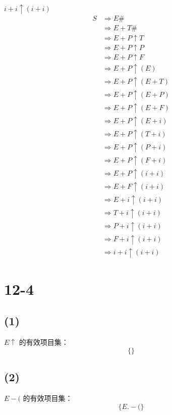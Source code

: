 \documentclass[UTF8]{ctexart}
\begin{document}
        $i+i\uparrow(i+i)$
        \begin{align*}
            S
            & \Rightarrow E\# \\
            & \Rightarrow E+T\# \\
            & \Rightarrow E+P\uparrow T \\
            & \Rightarrow E+P\uparrow P \\
            & \Rightarrow E+P\uparrow F \\
            & \Rightarrow E+P\uparrow (E) \\
            & \Rightarrow E+P\uparrow (E+T) \\
            & \Rightarrow E+P\uparrow (E+P) \\
            & \Rightarrow E+P\uparrow (E+F) \\
            & \Rightarrow E+P\uparrow (E+i) \\
            & \Rightarrow E+P\uparrow (T+i) \\
            & \Rightarrow E+P\uparrow (P+i) \\
            & \Rightarrow E+P\uparrow (F+i) \\
            & \Rightarrow E+P\uparrow (i+i) \\
            & \Rightarrow E+F\uparrow (i+i) \\
            & \Rightarrow E+i\uparrow (i+i) \\
            & \Rightarrow T+i\uparrow (i+i) \\
            & \Rightarrow P+i\uparrow (i+i) \\
            & \Rightarrow F+i\uparrow (i+i) \\
            & \Rightarrow i+i\uparrow (i+i)
        \end{align*}

\section*{12-4}

    \subsection*{(1)}
        $E\uparrow$ 的有效项目集：
        $$\{\}$$

    \subsection*{(2)}
        $E-($ 的有效项目集：
        $$\{E.-(\}$$
\end{document}
